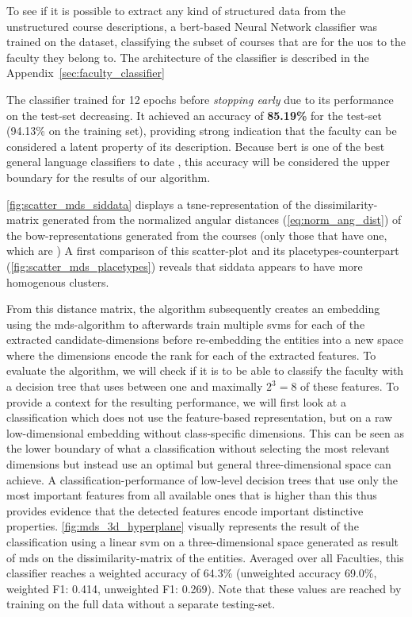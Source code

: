 To see if it is possible to extract any kind of structured data from the unstructured course descriptions, a \gls{bert}-based Neural Network classifier was trained on the dataset, classifying the subset of courses that are for the \gls{uos} to the faculty they belong to. The architecture of the classifier is described in the Appendix~\ref{sec:faculty_classifier}

The classifier trained for 12 epochs before \emph{stopping early} due to its performance on the test-set decreasing. It achieved an accuracy of \textbf{85.19\%} for the test-set (94.13\% on the training set), providing strong indication that the faculty can be considered a latent property of its description. Because \gls{bert} is one of the best general language classifiers to date \cite{Devlin2019}, this accuracy will be considered the upper boundary for the results of our algorithm.

\autoref{fig:scatter_mds_siddata} displays a \gls{tsne}-representation of the dissimilarity-matrix generated from the normalized angular distances (\autoref{eq:norm_ang_dist}) of the \gls{bow}-representations generated from the courses (only those that have one, which are ) A first comparison of this scatter-plot and its placetypes-counterpart (\autoref{fig:scatter_mds_placetypes}) reveals that siddata appears to have more homogenous clusters.

From this distance matrix, the algorithm subsequently creates an embedding using the \gls{mds}-algorithm to afterwards train multiple \glspl{svm} for each of the extracted candidate-dimensions before re-embedding the entities into a new space where the dimensions encode the \gls{rank} for each of the extracted features. To evaluate the algorithm, we will check if it is to be able to classify the faculty with a decision tree that uses between one and maximally $2^3=8$ of these features. To provide a context for the resulting performance, we will first look at a classification which does not use the feature-based representation, but on a raw low-dimensional embedding without class-specific dimensions. This can be seen as the lower boundary of what a classification without selecting the most relevant dimensions but instead use an optimal but general three-dimensional space can achieve. A classification-performance of low-level decision trees that use only the most important features from all available ones that is higher than this thus provides evidence that the detected features encode important distinctive properties. \autoref{fig:mds_3d_hyperplane} visually represents the result of the classification using a linear \gls{svm} on a three-dimensional space generated as result of \gls{mds} on the dissimilarity-matrix of the entities. Averaged over all Faculties, this classifier reaches a weighted accuracy of 64.3\% (unweighted accuracy 69.0\%, weighted F1: 0.414, unweighted F1: 0.269). Note that these values are reached by training on the full data without a separate testing-set.


